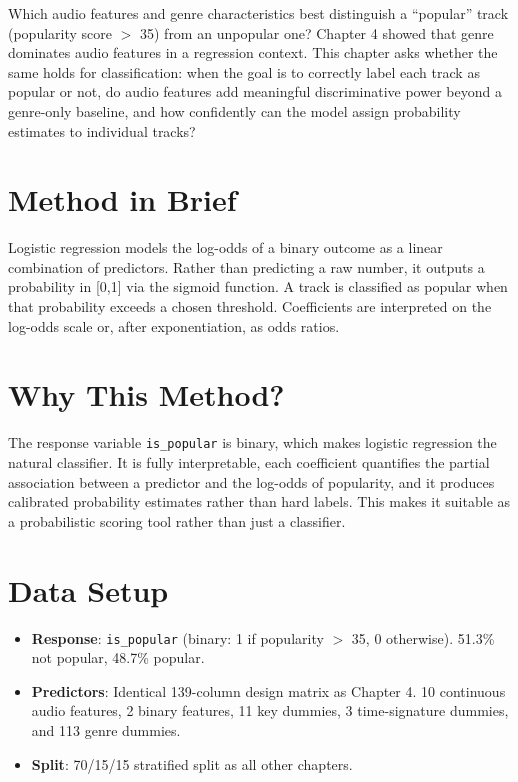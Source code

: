\documentclass[12pt, oneside]{book}
\begin{document}
Which audio features and genre characteristics best distinguish a ``popular'' track (popularity score $>$ 35) from an unpopular one? Chapter 4 showed that genre dominates audio features in a regression context. This chapter asks whether the same holds for classification: when the goal is to correctly label each track as popular or not, do audio features add meaningful discriminative power beyond a genre-only baseline, and how confidently can the model assign probability estimates to individual tracks?
 
\section{Method in Brief}
 
Logistic regression models the log-odds of a binary outcome as a linear combination of predictors. Rather than predicting a raw number, it outputs a probability in [0,1] via the sigmoid function. A track is classified as popular when that probability exceeds a chosen threshold. Coefficients are interpreted on the log-odds scale or, after exponentiation, as odds ratios.
 
\section{Why This Method?}
 
The response variable \texttt{is\_popular} is binary, which makes logistic regression the natural classifier. It is fully interpretable, each coefficient quantifies the partial association between a predictor and the log-odds of popularity, and it produces calibrated probability estimates rather than hard labels. This makes it suitable as a probabilistic scoring tool rather than just a classifier. 
 
\section{Data Setup}
 
\begin{itemize}
    \item \textbf{Response}: \texttt{is\_popular} (binary: 1 if popularity $>$ 35, 0 otherwise). 51.3\% not popular, 48.7\% popular.
    \item \textbf{Predictors}: Identical 139-column design matrix as Chapter 4. 10 continuous audio features, 2 binary features, 11 key dummies, 3 time-signature dummies, and 113 genre dummies.
    \item \textbf{Split}: 70/15/15 stratified split as all other chapters.
\end{itemize}
 
\end{document}
